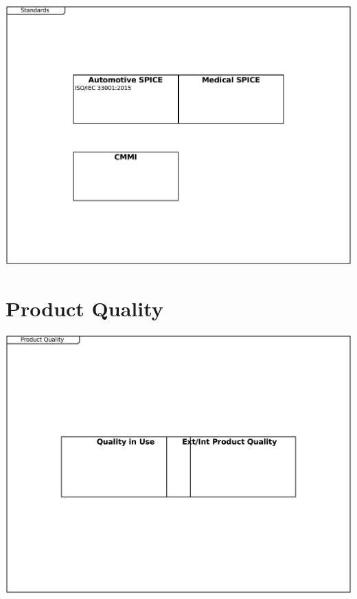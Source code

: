 \documentclass{article}
\begin{document}
\includegraphics[width= 1.0\linewidth]{quality_export/6_Standards.pdf}
\begin{alltt}

\end{alltt}

\section{Product Quality}

\includegraphics[width= 1.0\linewidth]{quality_export/2_Product_Quality.pdf}
\begin{alltt}

\end{alltt}
\end{document}
